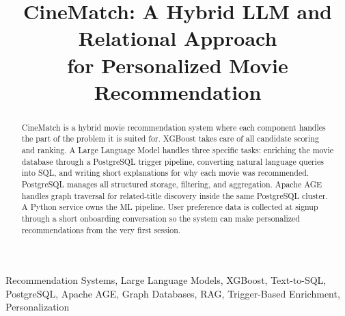 \documentclass[conference]{IEEEtran}
\begin{document}
\title{CineMatch: A Hybrid LLM and Relational Approach\\for Personalized Movie Recommendation}

\author{
\and
{}
\and
{}
\and
{}
\and
{}
}

\maketitle

\begin{abstract}
CineMatch is a hybrid movie recommendation system where each component handles the part of the problem it is suited for. XGBoost takes care of all candidate scoring and ranking. A Large Language Model handles three specific tasks: enriching the movie database through a PostgreSQL trigger pipeline, converting natural language queries into SQL, and writing short explanations for why each movie was recommended. PostgreSQL manages all structured storage, filtering, and aggregation. Apache AGE handles graph traversal for related-title discovery inside the same PostgreSQL cluster. A Python service owns the ML pipeline. User preference data is collected at signup through a short onboarding conversation so the system can make personalized recommendations from the very first session.
\end{abstract}

\begin{IEEEkeywords}
Recommendation Systems, Large Language Models, XGBoost, Text-to-SQL, PostgreSQL, Apache AGE, Graph Databases, RAG, Trigger-Based Enrichment, Personalization
\end{IEEEkeywords}
\end{document}

